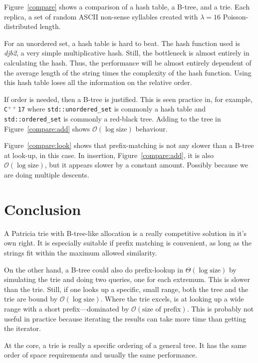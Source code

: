 \documentclass[12pt]{article}
\newcommand{\code}[1]{\colorbox{light-gray}{\texttt{#1}}}
\begin{document}
Figure~\ref{compare} shows a comparison of a hash table, a B-tree, and a trie. Each replica, a set of random ASCII non-sense syllables created with $\lambda = 16$ Poisson-distributed length.

For an unordered set, a hash table is hard to beat. The hash function used is {\it djb2}, a very simple multiplicative hash. Still, the bottleneck is almost entirely in calculating the hash. Thus, the performance will be almost entirely dependent of the average length of the string times the complexity of the hash function. Using this hash table loses all the information on the relative order.

If order is needed, then a B-tree is justified. This is seen practice in, for example, \code{C$^{++}$17} where \code{std::unordered\_set} is commonly a hash table and \code{std::ordered\_set} is commonly a red-black tree. Adding to the tree in Figure~\ref{compare:add} shows $\mathcal{O}(\log \text{size})$ behaviour.

Figure~\ref{compare:look} shows that prefix-matching is not any slower than a B-tree at look-up, in this case. In insertion, Figure~\ref{compare:add}, it is also $\mathcal{O}(\log \text{size})$, but it appears slower by a constant amount. Possibly because we are doing multiple descents.


\section{Conclusion}

A Patricia trie with B-tree-like allocation is a really competitive solution in it's own right. It is especially suitable if prefix matching is convenient, as long as the strings fit within the maximum allowed similarity.

On the other hand, a B-tree could also do prefix-lookup in $\Theta(\log \text{size})$ by simulating the trie and doing two queries, one for each extremum. This is slower than the trie. Still, if one looks up a specific, small range, both the tree and the trie are bound by $\mathcal{O}(\log \text{size})$. Where the trie excels, is at looking up a wide range with a short prefix—dominated by $\mathcal{O}(\text{size of prefix})$. This is probably not useful in practice because iterating the results can take more time than getting the iterator.

At the core, a trie is really a specific ordering of a general tree. It has the same order of space requirements and usually the same performance.


\end{document}
